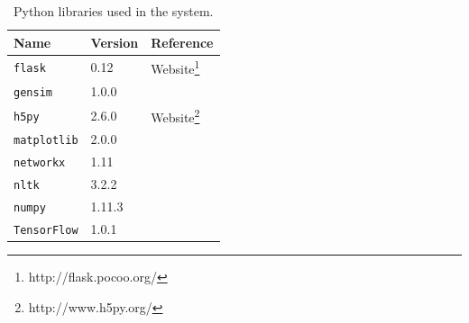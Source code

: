 \begin{table}[H]
	\centering
	\small
	\begin{adjustbox}{max width=\textwidth}
		\begin{tabular}{lll}
			\toprule
			Name & Version & Reference \\
			\midrule
			\texttt{flask} & 0.12 & Website\protect\footnote{http://flask.pocoo.org/}\\
			\texttt{gensim} & 1.0.0 & \cite{Radim:2010}\\
			\texttt{h5py} & 2.6.0 & Website\protect\footnote{http://www.h5py.org/}\\
			\texttt{matplotlib} & 2.0.0 & \cite{Hunter:2007}\\
			\texttt{networkx} & 1.11 & \cite{Hagberg:2008}\\
			\texttt{nltk} & 3.2.2 & \cite{Bird:2009}\\
			\texttt{numpy} & 1.11.3 & \cite{Walt:2011}\\
			\texttt{TensorFlow} & 1.0.1 & \cite{TensorFlow:2015}\\
			\bottomrule
		\end{tabular}
	\end{adjustbox}
	\caption{Python libraries used in the system.}
\end{table}
